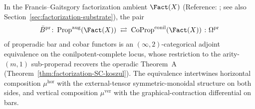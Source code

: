 \begin{theorem}\label{thm:properad-bar-cobar}
In the Francis--Gaitsgory factorization ambient $\Fact(X)$
(Reference: \cite{FG12}; see also Section~\ref{sec:factorization-substrate}),
the pair
\[
 \bar B^{\mathrm{pr}}\colon
 \operatorname{Prop}^{\mathrm{aug}}(\Fact(X))
 \;\rightleftarrows\;
 \operatorname{CoProp}^{\mathrm{conil}}(\Fact(X))
 \;\colon\Omega^{\mathrm{pr}}
\]
of properadic bar and cobar functors is an
$(\infty,2)$-categorical adjoint equivalence on the
conilpotent-complete locus, whose restriction to the arity-$(m,1)$
sub-properad recovers the operadic Theorem~A
(Theorem~\ref{thm:factorization-SC-koszul}). The equivalence
intertwines horizontal composition $\mu^{\mathrm{hor}}$ with
the external-tensor symmetric-monoidal structure on both sides,
and vertical composition $\mu^{\mathrm{ver}}$ with the
graphical-contraction differential on bars.
\end{theorem}
